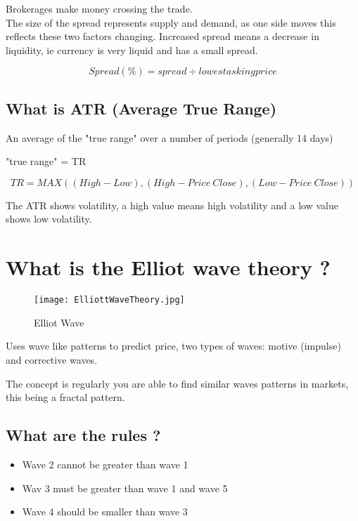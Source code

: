 \documentclass[11pt]{scrartcl} %
\begin{document}
Brokerages make money crossing the trade.\\

The size of the spread represents supply and demand, as one side moves this reflects these two factors
changing. Increased spread means a decrease in liquidity, ie currency is very liquid and has a small spread.

\[ Spread(\%) = spread \div lowest asking price \]

\subsection{What is ATR (Average True Range)}

An average of the "true range" over a number of periods (generally 14 days)

"true range" = TR

\[ TR = MAX((High-Low),(High - Price\:Close),(Low-Price\:Close)) \]

The ATR shows volatility, a high value means high volatility and a low value shows low volatility.

\section{What is the Elliot wave theory ?}

\begin{figure}[t] %
	\centering
	\texttt{[image: ElliottWaveTheory.jpg]} %
	\caption{Elliot Wave}
\end{figure}

Uses wave like patterns to predict price, two types of waves: motive (impulse) and corrective waves.

The concept is regularly you are able to find similar waves patterns in markets, this being
a fractal pattern.

\subsection{What are the rules ?}

\begin{itemize}
	\item Wave 2 cannot be greater than wave 1
	\item Wav 3 must be greater than wave 1 and wave 5
	\item Wave 4 should be smaller than wave 3
\end{itemize}
\end{document}
